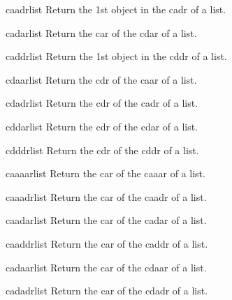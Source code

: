 \documentclass[10pt,english]{book}
\begin{document}
\begin{accessor}{caadr}{list}
  Return the 1st object in the cadr of a list.
\end{accessor}

\begin{accessor}{cadar}{list}
  Return the car of the cdar of a list.
\end{accessor}

\begin{accessor}{caddr}{list}
  Return the 1st object in the cddr of a list.
\end{accessor}

\begin{accessor}{cdaar}{list}
  Return the cdr of the caar of a list.
\end{accessor}

\begin{accessor}{cdadr}{list}
  Return the cdr of the cadr of a list.
\end{accessor}

\begin{accessor}{cddar}{list}
  Return the cdr of the cdar of a list.
\end{accessor}

\begin{accessor}{cdddr}{list}
  Return the cdr of the cddr of a list.
\end{accessor}

\begin{accessor}{caaaar}{list}
  Return the car of the caaar of a list.
\end{accessor}

\begin{accessor}{caaadr}{list}
  Return the car of the caadr of a list.
\end{accessor}

\begin{accessor}{caadar}{list}
  Return the car of the cadar of a list.
\end{accessor}

\begin{accessor}{caaddr}{list}
  Return the car of the caddr of a list.
\end{accessor}

\begin{accessor}{cadaar}{list}
  Return the car of the cdaar of a list.
\end{accessor}

\begin{accessor}{cadadr}{list}
  Return the car of the cdadr of a list.
\end{accessor}
\end{document}
